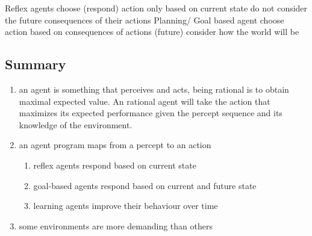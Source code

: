 \begin{outline}
    \1 Reflex agents
        \2 choose (respond) action only based on current state
        \2 do not consider the future consequences of their actions
    \1 Planning/ Goal based agent
        \2 choose action based on consequences of actions (future)
        \2 consider how the world will be
\end{outline}

\subsection{Summary}
\begin{enumerate}
    \item an agent is something that perceives and acts, being rational is to obtain maximal expected value. An rational agent will take the action that maximizes its expected performance given the percept sequence and its knowledge of the environment.
    \item an agent program maps from a percept to an action
    \begin{enumerate}
        \item reflex agents respond based on current state
        \item goal-based agents respond based on current and future state
        \item learning agents improve their behaviour over time
    \end{enumerate}
    \item some environments are more demanding than others
\end{enumerate}

\pagebreak